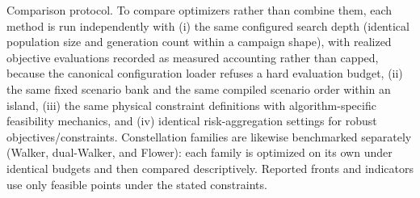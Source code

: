         Comparison protocol. To compare optimizers rather than combine them, each method is run independently with (i) the same configured search depth (identical population size and generation count within a campaign shape), with realized objective evaluations recorded as measured accounting rather than capped, because the canonical configuration loader refuses a hard evaluation budget, (ii) the same fixed scenario bank and the same compiled scenario order within an island, (iii) the same physical constraint definitions with algorithm-specific feasibility mechanics, and (iv) identical risk-aggregation settings for robust objectives/constraints. Constellation families are likewise benchmarked separately (Walker, dual-Walker, and Flower): each family is optimized on its own under identical budgets and then compared descriptively. Reported fronts and indicators use only feasible points under the stated constraints.


